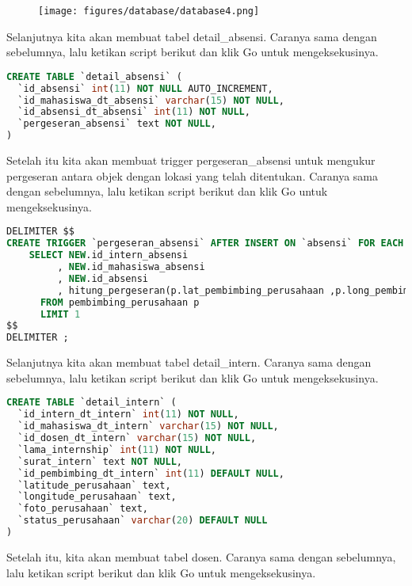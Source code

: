 \begin{figure}[H]
\centering
\texttt{[image: figures/database/database4.png]}
\end{figure}

\noindent
Selanjutnya kita akan membuat tabel detail\_absensi. Caranya sama dengan sebelumnya, lalu ketikan script berikut dan klik Go untuk mengeksekusinya.

\begin{lstlisting}[language=SQL]
CREATE TABLE `detail_absensi` (
  `id_absensi` int(11) NOT NULL AUTO_INCREMENT,
  `id_mahasiswa_dt_absensi` varchar(15) NOT NULL,
  `id_absensi_dt_absensi` int(11) NOT NULL,
  `pergeseran_absensi` text NOT NULL,
)
\end{lstlisting}

\noindent
Setelah itu kita akan membuat trigger pergeseran\_absensi untuk mengukur pergeseran antara objek dengan lokasi yang telah ditentukan. Caranya sama dengan sebelumnya, lalu ketikan script berikut dan klik Go untuk mengeksekusinya.

\begin{lstlisting}[language=SQL]
DELIMITER $$
CREATE TRIGGER `pergeseran_absensi` AFTER INSERT ON `absensi` FOR EACH ROW INSERT INTO detail_absensi (id_intern_dt_absensi,id_mahasiswa_dt_absensi,id_absensi_dt_absensi, pergeseran_absensi)
    SELECT NEW.id_intern_absensi
         , NEW.id_mahasiswa_absensi 
         , NEW.id_absensi 
         , hitung_pergeseran(p.lat_pembimbing_perusahaan ,p.long_pembimbing_perusahaan ,NEW.latitude_absensi,NEW.longitude_absensi)
      FROM pembimbing_perusahaan p
      LIMIT 1
$$
DELIMITER ;
\end{lstlisting}

\noindent
Selanjutnya kita akan membuat tabel detail\_intern. Caranya sama dengan sebelumnya, lalu ketikan script berikut dan klik Go untuk mengeksekusinya.

\begin{lstlisting}[language=SQL]
CREATE TABLE `detail_intern` (
  `id_intern_dt_intern` int(11) NOT NULL,
  `id_mahasiswa_dt_intern` varchar(15) NOT NULL,
  `id_dosen_dt_intern` varchar(15) NOT NULL,
  `lama_internship` int(11) NOT NULL,
  `surat_intern` text NOT NULL,
  `id_pembimbing_dt_intern` int(11) DEFAULT NULL,
  `latitude_perusahaan` text,
  `longitude_perusahaan` text,
  `foto_perusahaan` text,
  `status_perusahaan` varchar(20) DEFAULT NULL
)
\end{lstlisting}

\noindent
Setelah itu, kita akan membuat tabel dosen. Caranya sama dengan sebelumnya, lalu ketikan script berikut dan klik Go untuk mengeksekusinya.


